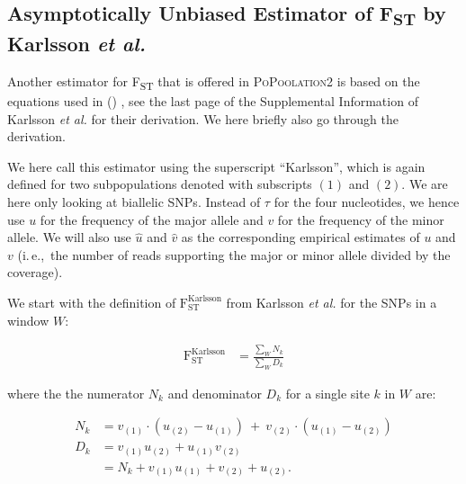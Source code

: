 \documentclass[letterpaper,fontsize=9pt,DIV=12]{scrartcl}
\newcommand\citeay[1]{\citeauthor{#1} (\citeyear{#1}) \cite{#1}}
\newcommand\toolname{\textsc}
\newcommand{\fst}{F\textsubscript{ST}}
\newcommand{\ie}{i.\,e.,~}
\begin{document}

\subsection{Asymptotically Unbiased Estimator of \texorpdfstring{\fst}{FST} by Karlsson \textit{et al.}}
\label{supp:sec:FST:sub:Karlsson}

Another estimator for \fst{} that is offered in \toolname{PoPoolation2} is based on the equations used in \citeay{Karlsson2007}, see the last page of the Supplemental Information of Karlsson \textit{et al.} for their derivation.
We here briefly also go through the derivation.

We here call this estimator using the superscript ``Karlsson'', which is again defined for two subpopulations denoted with subscripts $(1)$ and $(2)$.
We are here only looking at biallelic SNPs.
Instead of $\tau$ for the four nucleotides, we hence use $u$ for the frequency of the major allele and $v$ for the frequency of the minor allele.  We will also use $\widehat{u}$ and $\widehat{v}$ as the corresponding empirical estimates of $u$ and $v$ (\ie the number of reads supporting the major or minor allele divided by the coverage).

We start with the definition of $\text{F}_\text{ST}^\text{Karlsson}$ from Karlsson \textit{et al.} for the SNPs in a window $W$:

\begin{align}
    \label{eq:FstK}
    \text{F}_\text{ST}^\text{Karlsson} &= \frac{\sum_W N_k}{\sum_W D_k}
\end{align}

where the the numerator $N_k$ and denominator $D_k$ for a single site $k$ in $W$ are:

\begin{align}
    \label{eq:FstNk}
    N_k &= v_{(1)} \cdot ( u_{(2)} - u_{(1)} ) ~+~ v_{(2)} \cdot ( u_{(1)} - u_{(2)} ) \\
    \label{eq:FstDk}
    \nonumber
    D_k &= v_{(1)} u_{(2)} + u_{(1)} v_{(2)} \\
        &= N_k + v_{(1)} u_{(1)} + v_{(2)} + u_{(2)}.
\end{align}
\end{document}
